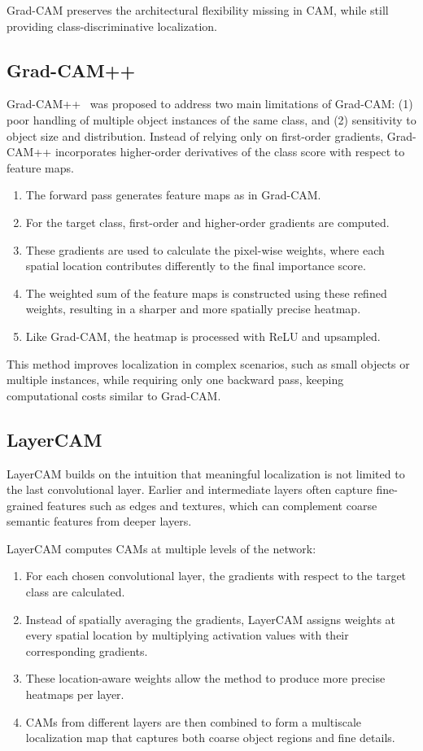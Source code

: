 Grad-CAM preserves the architectural flexibility missing in CAM, while still providing class-discriminative localization.

\subsection{Grad-CAM++}
Grad-CAM++~\cite{cam_gradpp} was proposed to address two main limitations of Grad-CAM: (1) poor handling of multiple object instances of the same class, and (2) sensitivity to object size and distribution. Instead of relying only on first-order gradients, Grad-CAM++ incorporates higher-order derivatives of the class score with respect to feature maps.

\begin{enumerate}
    \item The forward pass generates feature maps as in Grad-CAM.
    \item For the target class, first-order and higher-order gradients are computed.
    \item These gradients are used to calculate the pixel-wise weights, where each spatial location contributes differently to the final importance score.
    \item The weighted sum of the feature maps is constructed using these refined weights, resulting in a sharper and more spatially precise heatmap.
    \item Like Grad-CAM, the heatmap is processed with ReLU and upsampled.
\end{enumerate}

This method improves localization in complex scenarios, such as small objects or multiple instances, while requiring only one backward pass, keeping computational costs similar to Grad-CAM.

\subsection{LayerCAM}
LayerCAM\cite{layer_cam} builds on the intuition that meaningful localization is not limited to the last convolutional layer. Earlier and intermediate layers often capture fine-grained features such as edges and textures, which can complement coarse semantic features from deeper layers.

LayerCAM\cite{layer_cam} computes CAMs at multiple levels of the network:
\begin{enumerate}
    \item For each chosen convolutional layer, the gradients with respect to the target class are calculated.
    \item Instead of spatially averaging the gradients, LayerCAM\cite{layer_cam} assigns weights at every spatial location by multiplying activation values with their corresponding gradients.
    \item These location-aware weights allow the method to produce more precise heatmaps per layer.
    \item CAMs from different layers are then combined to form a multiscale localization map that captures both coarse object regions and fine details.
\end{enumerate}

